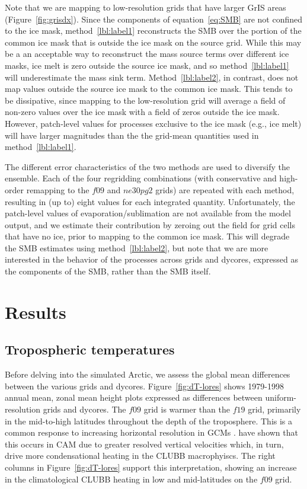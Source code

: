 \documentclass[draft]{agujournal2019}
\begin{document}
Note that we are mapping to low-resolution grids that have larger GrIS areas (Figure~\ref{fig:grisdx}). Since the components of equation~\ref{eq:SMB} are not confined to the ice mask, method~\ref{lbl:label1} reconstructs the SMB over the portion of the common ice mask that is outside the ice mask on the source grid. While this may be a an acceptable way to reconstruct the mass source terms over different ice masks, ice melt is zero outside the source ice mask, and so method~\ref{lbl:label1} will underestimate the mass sink term. Method~\ref{lbl:label2}, in contrast, does not map values outside the source ice mask to the common ice mask. This tends to be dissipative, since mapping to the low-resolution grid will average a field of non-zero values over the ice mask with a field of zeros outside the ice mask. However, patch-level values for processes exclusive to the ice mask (e.g., ice melt) will have larger magnitudes than the the grid-mean quantities used in method~\ref{lbl:label1}. %

The different error characteristics of the two methods are used to diversify the ensemble. Each of the four regridding combinations (with conservative and high-order remapping to the $f09$ and $ne30pg2$ grids) are repeated with each method, resulting in (up to) eight values for each integrated quantity. Unfortunately, the patch-level values of evaporation/sublimation are not available from the model output, and we estimate their contribution by zeroing out the field for grid cells that have no ice, prior to mapping to the common ice mask. This will degrade the SMB estimates using method~\ref{lbl:label2}, but note that we are more interested in the behavior of the processes across grids and dycores, expressed as the components of the SMB, rather than the SMB itself.

\section{Results}\label{sec:results}

\subsection{Tropospheric temperatures}

Before delving into the simulated Arctic, we assess the global mean differences between the various grids and dycores. Figure~\ref{fig:dT-lores} shows 1979-1998 annual mean, zonal mean height plots expressed as differences between uniform-resolution grids and dycores. The $f09$ grid is warmer than the $f19$ grid, primarily in the mid-to-high latitudes throughout the depth of the troposphere. This is a common response to increasing horizontal resolution in GCMs \cite{PS2002CD,RETAL2006JC}.
 have shown that this occurs in CAM due to greater resolved vertical velocities which, in turn, drive more condensational heating in the CLUBB macrophyiscs. The right columns in Figure~\ref{fig:dT-lores} support this interpretation, showing an increase in the climatological CLUBB heating in low and mid-latitudes on the $f09$ grid. 
\end{document}
